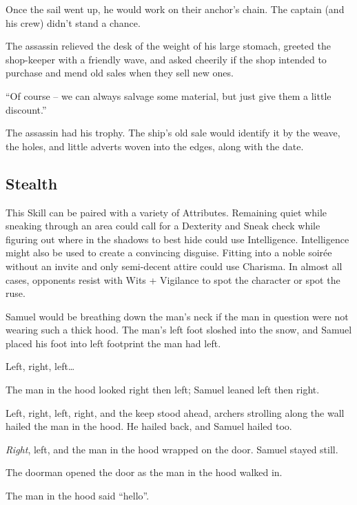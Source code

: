 \begin{multicols}{2}
\begin{exampletext}
  Once the sail went up, he would work on their anchor's chain.
  The captain (and his crew) didn't stand a chance.

  The assassin relieved the desk of the weight of his large stomach, greeted the shop-keeper with a friendly wave, and asked cheerily if the shop intended to purchase and mend old sales when they sell new ones.

  ``Of course -- we can always salvage some material, but just give them a little discount.''

  The assassin had his trophy.
  The ship's old sale would identify it by the weave, the holes, and little adverts woven into the edges, along with the date.

\end{exampletext}

\subsection{Stealth}

This Skill can be paired with a variety of Attributes.
Remaining quiet while sneaking through an area could call for a Dexterity and Sneak check while figuring out where in the shadows to best hide could use Intelligence.
Intelligence might also be used to create a convincing disguise.
Fitting into a noble soir\'{e}e without an invite and only semi-decent attire could use Charisma.
In almost all cases, opponents resist with Wits + Vigilance to spot the character or spot the ruse.

\begin{exampletext}
  Samuel would be breathing down the man's neck if the man in question were not wearing such a thick hood.
  The man's left foot sloshed into the snow, and Samuel placed his foot into left footprint the man had left.

  Left, right, left\ldots

  The man in the hood looked right then left; Samuel leaned left then right.

  Left, right, left, right, and the keep stood ahead, archers strolling along the wall hailed the man in the hood.
  He hailed back, and Samuel hailed too.

  \emph{Right}, left, and the man in the hood wrapped on the door.
  Samuel stayed still.

  The doorman opened the door as the man in the hood walked in.

  The man in the hood said ``hello''.


\end{exampletext}
\end{multicols}
